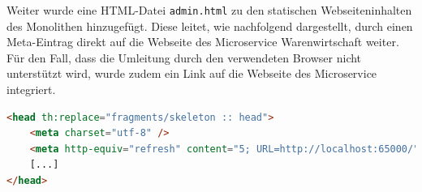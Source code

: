 Weiter wurde eine HTML-Datei \texttt{admin.html} zu den statischen Webseiteninhalten des Monolithen hinzugefügt. Diese leitet, wie nachfolgend dargestellt, durch einen Meta-Eintrag direkt auf die Webseite des Microservice Warenwirtschaft weiter. Für den Fall, dass die Umleitung durch den verwendeten Browser nicht unterstützt wird, wurde zudem ein Link auf die Webseite des Microservice integriert.

\begin{lstlisting}[caption=Datenabfrage von der Bestellung (Waren wurden bestellt), language=HTML]
<head th:replace="fragments/skeleton :: head">
	<meta charset="utf-8" />
    <meta http-equiv="refresh" content="5; URL=http://localhost:65000/"/>
    [...]
</head>
\end{lstlisting}

